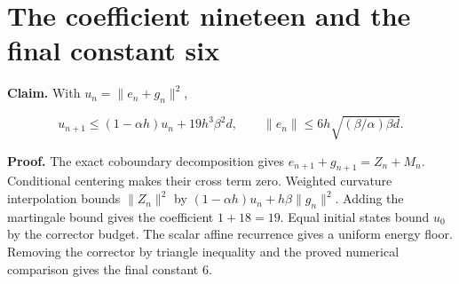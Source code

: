 \documentclass[11pt,a4paper]{article}
\begin{document}
\section{\texorpdfstring{The coefficient nineteen and the final constant six}{The coefficient nineteen and the final constant six}}


\textbf{Claim.} With \(u_n=\|e_n+g_n\|^2\),

\[u_{n+1}\le(1-\alpha h)u_n+19h^3\beta^2d,\qquad \|e_n\|\le6h\sqrt{(\beta/\alpha)\beta d}.\]

\textbf{Proof.} The exact coboundary decomposition gives \(e_{n+1}+g_{n+1}=Z_n+M_n\). Conditional centering makes their cross term zero. Weighted curvature interpolation bounds \(\|Z_n\|^2\) by \((1-\alpha h)u_n+h\beta\|g_n\|^2\). Adding the martingale bound gives the coefficient \(1+18=19\). Equal initial states bound \(u_0\) by the corrector budget. The scalar affine recurrence gives a uniform energy floor. Removing the corrector by triangle inequality and the proved numerical comparison gives the final constant \(6\).
\end{document}
